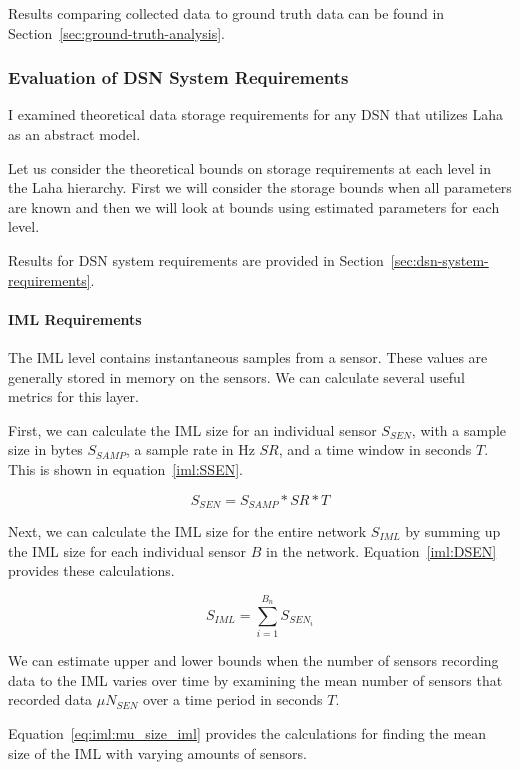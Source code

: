 Results comparing collected data to ground truth data can be found in Section~\ref{sec:ground-truth-analysis}.

\subsubsection{Evaluation of DSN System Requirements}\label{sssec:eval_of_dsn_system_requirements}
I examined theoretical data storage requirements for any DSN that utilizes Laha as an abstract model.

Let us consider the theoretical bounds on storage requirements at each level in the Laha hierarchy. First we will consider the storage bounds when all parameters are known and then we will look at bounds using estimated parameters for each level.

Results for DSN system requirements are provided in Section~\ref{sec:dsn-system-requirements}.

\paragraph{IML Requirements}
The IML level contains instantaneous samples from a sensor. These values are generally stored in memory on the sensors. We can calculate several useful metrics for this layer.

First, we can calculate the IML size for an individual sensor $S_{SEN}$, with a sample size in bytes $S_{SAMP}$, a sample rate in Hz $SR$, and a time window in seconds $T$. This is shown in equation~\ref{iml:SSEN}.

\begin{equation}\label{iml:SSEN}
	S_{SEN} = S_{SAMP} * SR * T
\end{equation}

Next, we can calculate the IML size for the entire network $S_{IML}$ by summing up the IML size for each individual sensor $B$ in the network. Equation~\ref{iml:DSEN} provides these calculations.

\begin{equation}\label{iml:DSEN}
	S_{IML} = \sum_{i=1}^{B_{n}} S_{SEN_{i}}
\end{equation}

We can estimate upper and lower bounds when the number of sensors recording data to the IML varies over time by examining the mean number of sensors that recorded data $\mu N_{SEN}$ over a time period in seconds $T$.

Equation~\ref{eq:iml:mu_size_iml} provides the calculations for finding the mean size of the IML with varying amounts of sensors.

